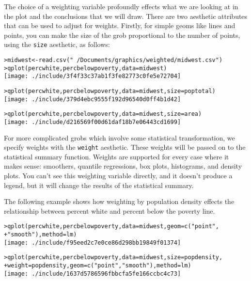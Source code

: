 \noindent The choice of a weighting variable profoundly effects what we are looking at in the plot and the conclusions that we will draw.  There are two aesthetic attributes that can be used to adjust for weights.  Firstly, for simple geoms like lines and points, you can make the size of the grob proportional to the number of points, using the {\tt size} aesthetic, as follows:

\begin{alltt}
> midwest <- read.csv("~/Documents/graphics/weighted/midwest.csv")
> qplot(percwhite, percbelowpoverty, data = midwest)
\texttt{[image: ./include/3f4f33c37ab1f3fe82773c0fe5e72704]}

> qplot(percwhite, percbelowpoverty, data = midwest, size = poptotal)
\texttt{[image: ./include/379d4ebc9555f192d96540d0ff4b1d42]}

> qplot(percwhite, percbelowpoverty, data = midwest, size = area)
\texttt{[image: ./include/d216569f00d61daf18b7e06443cd1699]}

\end{alltt}

For more complicated grobs which involve some statistical transformation, we specify weights with the {\tt weight} aesthetic.  These weights will be passed on to the statistical summary function.  Weights are supported for every case where it makes sense: smoothers, quantile regressions, box plots, histograms, and density plots.  You can't see this weighting variable directly, and it doesn't produce a legend, but it will change the results of the statistical summary.

The following example shows how weighting by population density effects the relationship between percent white and percent below the poverty line.

\begin{alltt}
> qplot(percwhite, percbelowpoverty, data = midwest, geom = c("point", 
+     "smooth"), method = lm)
\texttt{[image: ./include/f95eed2c7e0ce86d298bb19849f01374]}

> qplot(percwhite, percbelowpoverty, data = midwest, size = popdensity, 
+     weight = popdensity, geom = c("point", "smooth"), method = lm)
\texttt{[image: ./include/1637d5786596fbbcfa5fe166ccbc4c73]}

\end{alltt}

